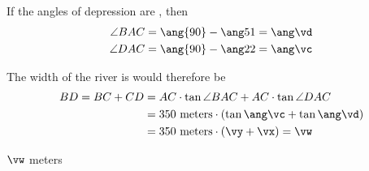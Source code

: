 \begin{solution}[\halfpage]
  If the angles of depression are \asif, then 
    \begin{align}
      \angle{BAC} &= \ang{90} - \ang\vb=\ang\vd \\
      \angle{DAC} &= \ang{90} - \ang\va = \ang\vc
    \end{align}

  The width of the river is would therefore be
  \begin{align}
  	BD = BC + CD &= AC\cdot\tan\angle{BAC} + AC\cdot\tan\angle{DAC} \\
  	  &= \vh\text{ meters}\cdot\left( \tan\ang\vc + \tan\ang\vd \right) \\
  	  &= \vh\text{ meters}\cdot(\vy + \vx) = \vw
  \end{align}
\end{solution}

\ifprintanswers\begin{codex}$\vw$ meters\end{codex}\fi
